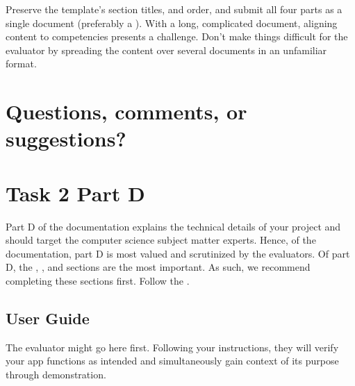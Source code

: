 \documentclass[letterpaper,10pt,english]{jupyterBook}
\begin{document}
\sphinxAtStartPar
Preserve the template’s section titles, and order, and submit all four parts as a single document (preferably a ). With a long, complicated document, aligning content to competencies presents a challenge. Don’t make things difficult for the evaluator by spreading the content over several documents in an unfamiliar format.


\section{Questions, comments, or suggestions?}
\label{\detokenize{task2_doc/task2_doc:questions-comments-or-suggestions}}


\sphinxstepscope


\section{Task 2 Part D}
\label{\detokenize{task2_doc/task2_doc_d:task-2-part-d}}\label{\detokenize{task2_doc/task2_doc_d::doc}}\label{\detokenize{task2_doc/task2_doc_d:task2-doc-d}}
\sphinxAtStartPar
Part D of the documentation explains the technical details of your project and should target the computer science subject matter experts. Hence, of the documentation, part D is most valued and scrutinized by the evaluators. Of part D, the , , and  sections are the most important. As such, we recommend completing these sections first. Follow the .


\subsection{User Guide}
\label{\detokenize{task2_doc/task2_doc_d:user-guide}}\label{\detokenize{task2_doc/task2_doc_d:task2-doc-d-user-guide}}
\sphinxAtStartPar
The evaluator might go here first. Following your instructions, they will verify your app functions as intended and simultaneously gain context of its purpose through demonstration.
\end{document}
